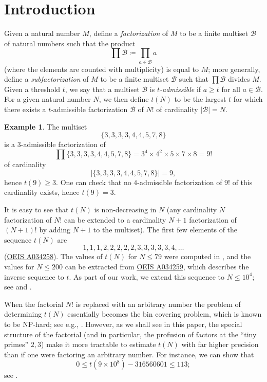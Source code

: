 \documentclass[12pt,a4paper,reqno]{amsart}
\numberwithin{equation}{section}
\theoremstyle{plain}
\theoremstyle{definition}
\newtheorem{example}[theorem]{Example}
\newcommand\tuple{{\mathcal B}}
\begin{document}
\section{Introduction}

Given a natural number $M$, define a \emph{factorization} of $M$ to be a finite multiset $\tuple$ of natural numbers such that the product
$$ \prod \tuple \coloneqq \prod_{a \in \tuple} a$$
(where the elements are counted with multiplicity) is equal to $M$; more generally, define a \emph{subfactorization} of $M$ to be a finite multiset $\tuple$ such that $\prod \tuple$ divides $M$.  Given a threshold $t$, we say that a multiset $\tuple$ is \emph{$t$-admissible} if $a \geq t$ for all $a \in \tuple$.  For a given natural number $N$, we then define $t(N)$ to be the largest $t$ for which there exists a $t$-admissible factorization $\tuple$ of $N!$ of cardinality $|\tuple|=N$.  

\begin{example}\label{nine}  The multiset
  $$ \{ 3,3,3,3,4,4,5,7,8\}$$
  is a $3$-admissible factorization of 
$$ \prod \{ 3,3,3,3,4,4,5,7,8\} = 3^4 \times 4^2 \times 5 \times 7 \times 8 = 9!$$
of cardinality 
$$|\{ 3,3,3,3,4,4,5,7,8\}| = 9,$$
 hence $t(9) \geq 3$.  One can check that no $4$-admissible factorization of $9!$ of this cardinality exists, hence $t(9) = 3$.
\end{example}

It is easy to see that $t(N)$ is non-decreasing in $N$ (any cardinality $N$ factorization of $N!$ can be extended to a cardinality $N+1$ factorization of $(N+1)!$ by adding $N+1$ to the multiset).  The first few elements of the sequence $t(N)$ are
$$ 1,1,1,2,2,2,2,2,3,3,3,3,3,4, \dots$$
(\href{https://oeis.org/A034258}{OEIS A034258}). The values of $t(N)$ for $N \leq 79$ were computed in \cite{guy-selfridge}, and the values for $N \leq 200$ can be extracted from \href{https://oeis.org/A034259}{OEIS A034259}, which describes the inverse sequence to $t$.  As part of our work, we extend this sequence to $N \leq 10^4$; see \cite{github} and .

When the factorial $N!$ is replaced with an arbitrary number the problem of determining $t(N)$ essentially becomes the bin covering problem, which is known to be NP-hard; see e.g., \cite{bincover}.  However, as we shall see in this paper, the special structure of the factorial (and in particular, the profusion of factors at the ``tiny primes'' $2,3$) make it more tractable to estimate $t(N)$ with far higher precision than if one were factoring an arbitrary number.  For instance, we can show that
$$ 0 \leq t(9 \times 10^8) - \num{316560601} \leq 113;$$
see .
\end{document}
